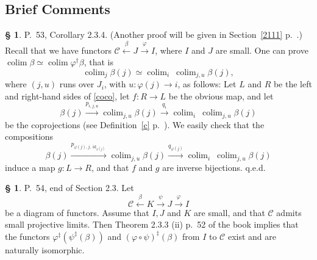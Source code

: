 \documentclass[12pt]{article}%
\theoremstyle{remark}
\theoremstyle{definition}
\newtheorem{s}[thm]{\S}%
\newcommand{\C}{\mathcal C}
\newcommand{\pp}{\varphi}
\newcommand{\xr}{\xrightarrow}
\DeclareMathOperator*{\colim}{colim}%
\DeclareMathOperator{\id}{id}
\begin{document}

\subsection{Brief Comments}

\begin{s} P.~53, Corollary 2.3.4. (Another proof will be given in Section~\ref{2111} p.~\pageref{2111}.) Recall that we have functors $\C\xleftarrow\beta J\xrightarrow\pp I$, where $I$ and $J$ are small. One can prove $\colim\beta\simeq\colim\pp^\dagger\beta$, that is 
%
\begin{equation}\label{coco}
\colim_j\beta(j)\simeq\colim_i\ \colim_{j,u}\beta(j),
\end{equation} 
%
where $(j,u)$ runs over $J_i$, with $u:\pp(j)\to i$, as follows: Let $L$ and $R$ be the left and right-hand sides of \eqref{coco}, let $f:R\to L$ be the obvious map, and let
$$ 
\beta(j)\xrightarrow{p_{i,j,u}}\colim_{j,u}\beta(j)\xrightarrow{q_i}\colim_i\ \colim_{j,u}\beta(j)
$$ 
be the coprojections (see Definition~\ref{c} p.~\pageref{c}). We easily check that the compositions 
$$
\beta(j)\xrightarrow{p_{\pp(j),j,\id_{\pp(j)}}}\colim_{j,u}\beta(j)\xrightarrow{q_{\pp(j)}}\colim_i\ \colim_{j,u}\beta(j)
$$ 
induce a map $g:L\to R$, and that $f$ and $g$ are inverse bijections. q.e.d.
\end{s} 

% 

\begin{s}\label{spreptom}
P.~54, end of Section 2.3. Let 
\begin{equation}\label{epreptom}
\C\xleftarrow\beta K\xr\psi J\xr\pp I
\end{equation} 
be a diagram of functors. Assume that $I,J$ and $K$ are small, and that $\C$ admits small projective limits. Then Theorem 2.3.3 (ii) p.~52 of the book implies that the functors $\pp^\ddagger(\psi^\ddagger(\beta))$ and $(\pp\circ\psi)^\ddagger(\beta)$ from $I$ to $\C$ exist and are naturally isomorphic. 
\end{s}

%
\end{document}
